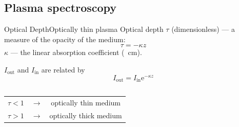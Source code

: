 \documentclass[dvipsnames]{beamer}
\begin{document}
\subsection{Plasma spectroscopy}
\begin{frame}{Optical Depth}{Optically thin plasma}
 Optical depth $\tau$ \small{(dimensionless)} --- a measure of the opacity of the medium:
 \begin{equation*}
   \tau=-\kappa z
 \end{equation*}
 $\kappa$ --- the linear absorption coefficient (\si{\per\cm}).

 $I_\text{out}$ and $I_\text{in}$ are related by
 \begin{equation*}
   I_\text{out} = I_\text{in}\mathrm{e}^{-\kappa z} %
 \end{equation*}
\begin{columns}
     
 \begin{center}
 \begin{tabular}{ c c c }
   $\tau<1$ & $\longrightarrow$ & optically thin medium\\ 
   $\tau>1$ & $\longrightarrow$ & optically thick medium
 \end{tabular}
 \end{center}
\end{columns}
\end{frame}
\end{document}
